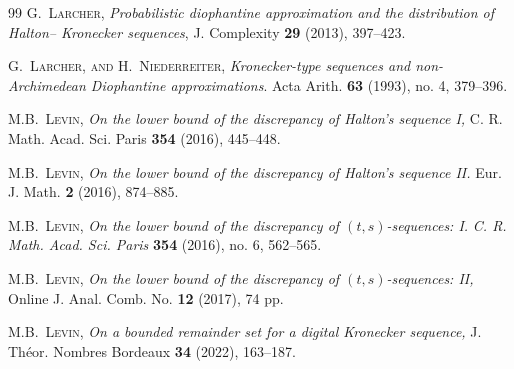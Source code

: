 \documentclass{article}
\renewcommand{\(}{\left (}
\renewcommand{\)}{\right )}
\theoremstyle{definition}
\numberwithin{equation}{section}
\begin{document}
\begin{thebibliography}{99}
 \textsc{G.~Larcher}, \textit{Probabilistic diophantine approximation and the distribution of Halton–
Kronecker sequences}, J. Complexity {\bf29} (2013), 397--423.









\textsc{G.~Larcher, and H.~Niederreiter}, \textit{Kronecker-type sequences and non-Archimedean Diophantine approximations}.
Acta Arith. {\bf63} (1993), no. 4, 379--396.


\textsc{M.B.~Levin}, \textit{On the lower bound of the discrepancy of Halton's sequence I,}  {C. R. Math. Acad. Sci. Paris} {\bf354} (2016), 445--448.

 \textsc{M.B.~Levin}, \textit{On the lower bound of the discrepancy of Halton's sequence II.}
{Eur. J. Math.} {\bf2} (2016), 874--885.

 \textsc{M.B.~Levin}, \textit{On the lower bound of the discrepancy of $(t,s)$-sequences: I.} \emph{C. R. Math. Acad. Sci. Paris} \textbf{354} (2016),  no. 6, 562--565. 

 \textsc{M.B.~Levin}, \textit{On the lower bound of the discrepancy of $(t,s)$-sequences: II,} {Online J. Anal. Comb.  No.} {\bf12} (2017), 74 pp. 

  \textsc{M.B.~Levin}, \textit{On a bounded remainder set for a digital Kronecker sequence,} {J. Th\'{e}or. Nombres Bordeaux} {\bf34} (2022), 163--187. 



\end{thebibliography}
\end{document}
